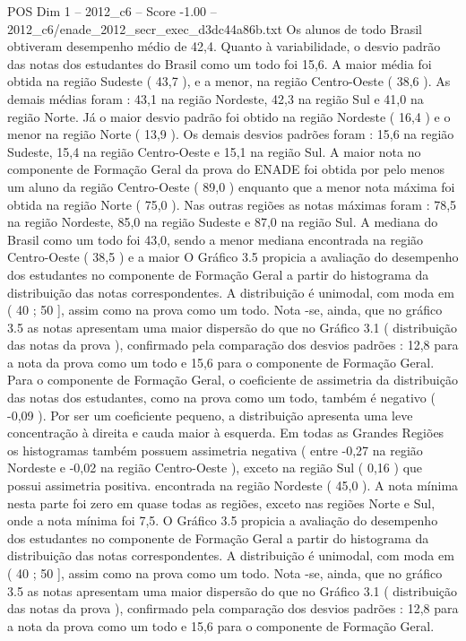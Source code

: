 \begin{textsample}{POS Dim 1 – 2012\_c6 – Score -1.00 – 2012\_c6/enade\_2012\_secr\_exec\_d3dc44a86b.txt}
Os alunos de todo Brasil obtiveram desempenho médio de 42,4.
Quanto à variabilidade, o desvio padrão das notas dos estudantes do Brasil como um todo foi 15,6.
A maior média foi obtida na região Sudeste ( 43,7 ), e a menor, na região Centro-Oeste ( 38,6 ).
As demais médias foram : 43,1 na região Nordeste, 42,3 na região Sul e 41,0 na região Norte.
Já o maior desvio padrão foi obtido na região Nordeste ( 16,4 ) e o menor na região Norte ( 13,9 ).
Os demais desvios padrões foram : 15,6 na região Sudeste, 15,4 na região Centro-Oeste e 15,1 na região Sul.
A maior nota no componente de Formação Geral da prova do ENADE foi obtida por pelo menos um aluno da região Centro-Oeste ( 89,0 ) enquanto que a menor nota máxima foi obtida na região Norte ( 75,0 ).
Nas outras regiões as notas máximas foram : 78,5 na região Nordeste, 85,0 na região Sudeste e 87,0 na região Sul.
A mediana do Brasil como um todo foi 43,0, sendo a menor mediana encontrada na região Centro-Oeste ( 38,5 ) e a maior O Gráfico 3.5 propicia a avaliação do desempenho dos estudantes no componente de Formação Geral a partir do histograma da distribuição das notas correspondentes.
A distribuição é unimodal, com moda em ( 40 ; 50 ], assim como na prova como um todo.
Nota -se, ainda, que no gráfico 3.5 as notas apresentam uma maior dispersão do que no Gráfico 3.1 ( distribuição das notas da prova ), confirmado pela comparação dos desvios padrões : 12,8 para a nota da prova como um todo e 15,6 para o componente de Formação Geral.
Para o componente de Formação Geral, o coeficiente de assimetria da distribuição das notas dos estudantes, como na prova como um todo, também é negativo ( -0,09 ).
Por ser um coeficiente pequeno, a distribuição apresenta uma leve concentração à direita e cauda maior à esquerda.
Em todas as Grandes Regiões os histogramas também possuem assimetria negativa ( entre -0,27 na região Nordeste e -0,02 na região Centro-Oeste ), exceto na região Sul ( 0,16 ) que possui assimetria positiva. encontrada na região Nordeste ( 45,0 ).
A nota mínima nesta parte foi zero em quase todas as regiões, exceto nas regiões Norte e Sul, onde a nota mínima foi 7,5.
O Gráfico 3.5 propicia a avaliação do desempenho dos estudantes no componente de Formação Geral a partir do histograma da distribuição das notas correspondentes.
A distribuição é unimodal, com moda em ( 40 ; 50 ], assim como na prova como um todo.
Nota -se, ainda, que no gráfico 3.5 as notas apresentam uma maior dispersão do que no Gráfico 3.1 ( distribuição das notas da prova ), confirmado pela comparação dos desvios padrões : 12,8 para a nota da prova como um todo e 15,6 para o componente de Formação Geral.

\end{textsample}
